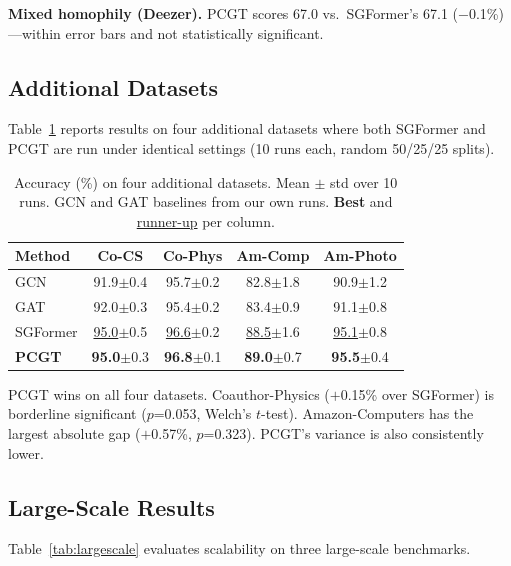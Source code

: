 \documentclass[manuscript, screen, review, anonymous]{acmart}
\newcommand{\best}[1]{\textcolor{bestcolor}{\textbf{#1}}}
\newcommand{\runup}[1]{\textcolor{runnerup}{\underline{#1}}}
\begin{document}
\textbf{Mixed homophily (Deezer).} PCGT scores 67.0 vs.\ SGFormer's 67.1 ($-$0.1\%)---within error bars and not statistically significant.

\subsection{Additional Datasets}

Table~\ref{tab:new_datasets} reports results on four additional datasets where both SGFormer and PCGT are run under identical settings (10 runs each, random 50/25/25 splits).

\begin{table}[t]
\caption{Accuracy (\%) on four additional datasets. Mean $\pm$ std over 10 runs. GCN and GAT baselines from our own runs. \best{Best} and \runup{runner-up} per column.}
\label{tab:new_datasets}
\centering
\small
\setlength{\tabcolsep}{3pt}
\begin{tabular}{l|cccc}
\toprule
\textbf{Method} & \textbf{Co-CS} & \textbf{Co-Phys} & \textbf{Am-Comp} & \textbf{Am-Photo} \\
\midrule
GCN & 91.9{\scriptsize$\pm$0.4} & 95.7{\scriptsize$\pm$0.2} & 82.8{\scriptsize$\pm$1.8} & 90.9{\scriptsize$\pm$1.2} \\
GAT & 92.0{\scriptsize$\pm$0.3} & 95.4{\scriptsize$\pm$0.2} & 83.4{\scriptsize$\pm$0.9} & 91.1{\scriptsize$\pm$0.8} \\
SGFormer & \runup{95.0}{\scriptsize$\pm$0.5} & \runup{96.6}{\scriptsize$\pm$0.2} & \runup{88.5}{\scriptsize$\pm$1.6} & \runup{95.1}{\scriptsize$\pm$0.8} \\
\textbf{PCGT} & \best{95.0}{\scriptsize$\pm$0.3} & \best{96.8}{\scriptsize$\pm$0.1} & \best{89.0}{\scriptsize$\pm$0.7} & \best{95.5}{\scriptsize$\pm$0.4} \\
\bottomrule
\end{tabular}
\end{table}

PCGT wins on all four datasets. Coauthor-Physics ($+$0.15\% over SGFormer) is borderline significant ($p$=0.053, Welch's $t$-test). Amazon-Computers has the largest absolute gap ($+$0.57\%, $p$=0.323). PCGT's variance is also consistently lower.

\subsection{Large-Scale Results}

Table~\ref{tab:largescale} evaluates scalability on three large-scale benchmarks.
\end{document}
